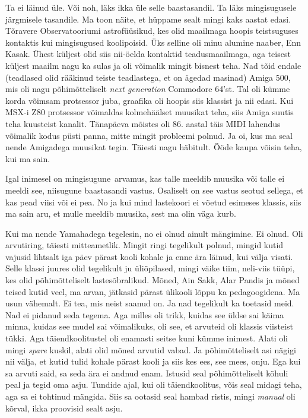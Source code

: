 Ta ei läinud üle. Või noh, läks ikka üle selle baastasandil. Ta läks 
mingisugusele järgmisele tasandile. Ma toon näite, et hüppame sealt mingi kaks 
aastat edasi. Tõravere Observatooriumi 
astrofüüsikud, kes olid maailmaga  hoopis teistsuguses kontaktis kui 
mingisugused koolipoisid. Üks selline oli minu alumine naaber,  Enn 
Kasak. Ühest küljest olid siis nii-öelda kontaktid 
teadusmaailmaga, aga teisest küljest maailm nagu ka sulas ja oli 
võimalik mingit bisnest teha. Nad  tõid endale (teadlased olid 
rääkinud teiste teadlastega, et on ägedad masinad) Amiga 
500,  mis oli nagu 
põhimõtteliselt \emph{next generation}  Commodore 64'st. Tal oli kümme 
korda võimsam protsessor juba,  graafika oli hoopis siis klassist ja nii edasi. 
Kui MSX-i Z80 protsessor  võimaldas  kolmehäälset muusikat teha, siis Amiga 
suutis teha  kuusteist kanalit. Tänapäeva mõistes oli 86. aastal täis MIDI 
lahendus  võimalik kodus püsti panna, mitte mingit probleemi polnud. Ja oi, kus 
ma seal nende Amigadega muusikat tegin. Täiesti nagu häbitult. Ööde kaupa 
võisin teha, kui ma sain.


Igal inimesel on mingisugune arvamus, kas talle  meeldib muusika või talle ei 
meeldi see, niisugune baastasandi vastus. Osaliselt on see vastus seotud sellega, et 
kas pead viisi või ei pea. No ja kui mind lastekoori ei võetud esimeses 
klassis, siis ma sain aru, et mulle meeldib muusika, sest ma olin väga kurb. 

Kui ma nende Yamahadega tegelesin, no ei olnud ainult mängimine. Ei olnud. 
Oli arvutiring, täiesti mitteametlik. Mingit ringi tegelikult polnud, mingid 
kutid vajusid lihtsalt iga päev pärast kooli kohale ja enne ära läinud, kui välja 
visati. Selle klassi juures olid tegelikult ju   
üliõpilased, mingi väike tiim, neli-viis tüüpi, kes  olid põhimõtteliselt 
lastesõbralikud. Mõned, Ain Sakk, Alar Pandis ja mõned teised kutid  
veel, ma arvan, jätkasid pärast ülikooli lõppu ka pedagoogidena. Ma usun 
vähemalt. Ei tea, mis neist saanud on. Ja nad tegelikult ka toetasid meid. Nad ei pidanud 
seda tegema. Aga milles oli trikk, kuidas see üldse sai käima minna, kuidas see 
mudel sai võimalikuks, oli see, et arvuteid oli klassis viisteist tükki. Aga 
täiendkoolitustel oli enamasti seitse kuni kümme inimest. 
Alati oli mingi \emph{spare} kuskil, alati olid mõned arvutid vabad. 
Ja põhimõtteliselt asi nägigi nii välja, et kutid tulid kohale pärast  kooli ja 
siis kes ees, see mees, onju. Ega kui sa arvuti said, sa seda ära ei 
andnud enam. Istusid seal põhimõtteliselt kõhuli peal ja tegid oma asju. 
Tundide ajal, kui oli täiendkoolitus, võis seal midagi teha, aga sa ei tohtinud 
mängida. Siis sa ootasid seal hambad ristis, mingi \emph{manual} oli 
kõrval, ikka proovisid sealt asju. 

